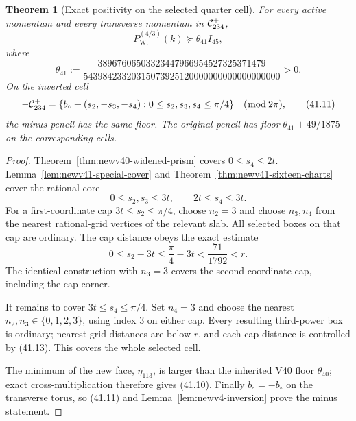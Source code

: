 \documentclass[11pt,oneside]{article}
\newtheorem{theorem}{Theorem}[section]
\theoremstyle{definition}
\theoremstyle{remark}
\begin{document}
\begin{theorem}[Exact positivity on the selected quarter cell]
\label{thm:newv41-selected-quarter-cell}
For every active momentum and every transverse momentum in
\({\cal C}_{234}^{+}\),
\[
 P_{\mathrm W,+}^{(4/3)}(k)
 \succeq\theta_{41}I_{45},                             \tag{41.9}
\]
where
\[
 \theta_{41}:=
 \frac{38967606503323447966954527325371479}
 {54398423320315073925120000000000000000000}>0.        \tag{41.10}
\]
On the inverted cell
\[
 -{\cal C}_{234}^{+}
 =\{b_\circ+(s_2,-s_3,-s_4):
       0\le s_2,s_3,s_4\le\pi/4\}\quad(\bmod\,2\pi),   \tag{41.11}
\]
the minus pencil has the same floor.  The original pencil has
floor \(\theta_{41}+49/1875\) on the corresponding cells.
\end{theorem}

\begin{proof}
Theorem~\ref{thm:newv40-widened-prism} covers
\(0\le s_4\le2t\).  Lemma~\ref{lem:newv41-special-cover} and
Theorem~\ref{thm:newv41-sixteen-charts} cover the rational core
\[
 0\le s_2,s_3\le3t,\qquad 2t\le s_4\le3t.              \tag{41.12}
\]
For a first-coordinate cap \(3t\le s_2\le\pi/4\), choose
\(n_2=3\) and choose \(n_3,n_4\) from the nearest rational-grid
vertices of the relevant slab.  All selected boxes on that cap
are ordinary.  The cap distance obeys the exact estimate
\[
 0\le s_2-3t\le\frac{\pi}{4}-3t
 <\frac{71}{1792}<r.                                   \tag{41.13}
\]
The identical construction with \(n_3=3\) covers the
second-coordinate cap, including the cap corner.

It remains to cover \(3t\le s_4\le\pi/4\).  Set \(n_4=3\) and
choose the nearest \(n_2,n_3\in\{0,1,2,3\}\), using index \(3\)
on either cap.  Every resulting third-power box is ordinary;
nearest-grid distances are below \(r\), and each cap distance is
controlled by (41.13).  This covers the whole selected cell.

The minimum of the new face, \(\eta_{113}\), is larger than the
inherited V40 floor \(\theta_{40}\); exact
cross-multiplication therefore gives (41.10).
Finally \(b_\circ=-b_\circ\) on the transverse torus, so (41.11)
and Lemma~\ref{lem:newv4-inversion} prove the minus statement.
\end{proof}
\end{document}
